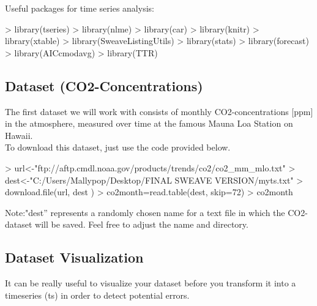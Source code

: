 \documentclass[11pt, a4paper]{article} %
\begin{document}
\noindent Useful packages for time series analysis:

\begin{Schunk}
\begin{Sinput}
> library(tseries)
> library(nlme)
> library(car)
> library(knitr)
> library(xtable)
> library(SweaveListingUtils)
> library(stats)
> library(forecast)
> library(AICcmodavg)
> library(TTR)
\end{Sinput}
\end{Schunk}

\subsection{Dataset (CO2-Concentrations)}%
The first dataset we will work with consists of monthly CO2-concentrations [ppm] in the atmosphere, measured over time at the famous Mauna Loa Station on Hawaii.\\
To download this dataset, just use the code provided below.

\begin{Schunk}
\begin{Sinput}
> url<-"ftp://aftp.cmdl.noaa.gov/products/trends/co2/co2_mm_mlo.txt"
> dest<-"C:/Users/Mallypop/Desktop/FINAL SWEAVE VERSION/myts.txt"
> download.file(url, dest ) 
> co2month=read.table(dest, skip=72)
> co2month
\end{Sinput}
\end{Schunk}

\noindent Note:"dest'' represents a randomly chosen  name for a text file in which the CO2-dataset will be saved. Feel free to adjust the name and directory.


\subsection{Dataset Visualization}%
It can be really useful to visualize your dataset before you transform it into a timeseries (ts) in order to detect potential errors.
\end{document}

